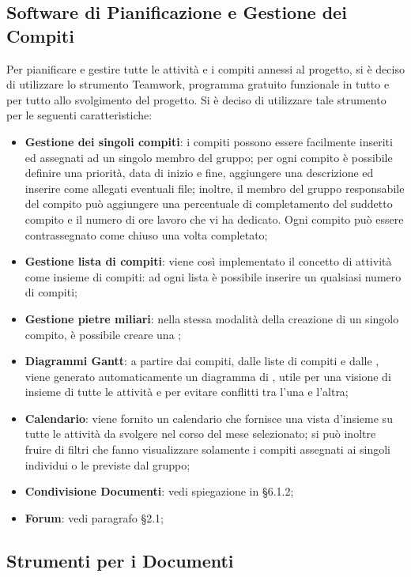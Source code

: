 \subsection{Software di Pianificazione e Gestione dei Compiti}
Per pianificare e gestire tutte le attività e i compiti annessi al progetto, si è deciso di utilizzare lo strumento Teamwork, programma gratuito funzionale in tutto e per tutto allo svolgimento del progetto. Si è deciso di utilizzare tale strumento per le seguenti caratteristiche:
\begin{itemize}
\item \textbf{Gestione dei singoli compiti}: i compiti possono essere facilmente inseriti ed assegnati ad un singolo membro del gruppo; per ogni compito è possibile definire una priorità, data di inizio e fine, aggiungere una descrizione ed inserire come allegati eventuali file; inoltre, il membro del gruppo responsabile del compito può aggiungere una percentuale di completamento del suddetto compito e il numero di ore lavoro che vi ha dedicato. Ogni compito può essere contrassegnato come chiuso una volta completato;
\item \textbf{Gestione lista di compiti}: viene così implementato il concetto di attività come insieme di compiti: ad ogni lista è possibile inserire un qualsiasi numero di compiti;
\item \textbf{Gestione pietre miliari}: nella stessa modalità della creazione di un singolo compito, è possibile creare una ;
\item \textbf{Diagrammi Gantt}: a partire dai compiti, dalle liste di compiti e dalle , viene generato automaticamente un diagramma di , utile per una visione di insieme di tutte le attività e per evitare conflitti tra l'una e l'altra;
\item \textbf{Calendario}: viene fornito un calendario che fornisce una vista d'insieme su tutte le attività da svolgere nel corso del mese selezionato; si può inoltre fruire di filtri che fanno visualizzare solamente i compiti assegnati ai singoli individui o le  previste dal gruppo;
\item \textbf{Condivisione Documenti}: vedi spiegazione in §6.1.2;
\item \textbf{Forum}: vedi paragrafo §2.1;
\end{itemize}

\subsection{Strumenti per i Documenti}
